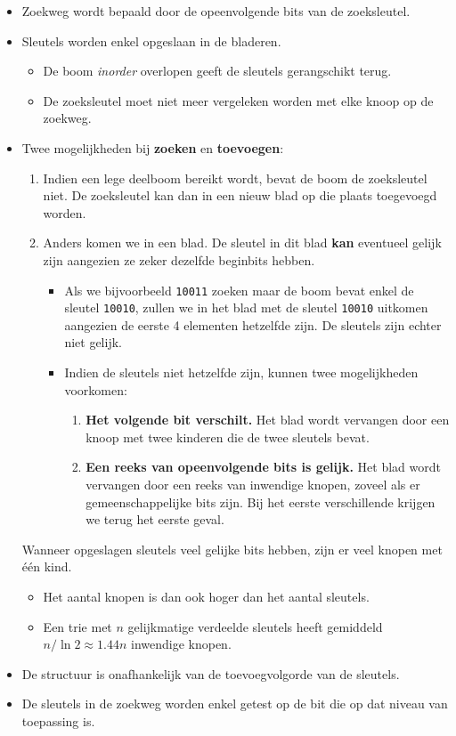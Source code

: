 \begin{itemize}
    \item Zoekweg wordt bepaald door de opeenvolgende bits van de zoeksleutel.
    \item Sleutels worden enkel opgeslaan in de bladeren.
    \begin{itemize}
        \item  De boom \textit{inorder} overlopen geeft de sleutels gerangschikt terug.
        \item  De zoeksleutel moet niet meer vergeleken worden met elke knoop op de zoekweg. 
    \end{itemize}
    \item Twee mogelijkheden bij \textbf{zoeken} en \textbf{toevoegen}:
    \begin{enumerate}
        \item Indien een lege deelboom bereikt wordt, bevat de boom de zoeksleutel niet. De zoeksleutel kan dan in een nieuw blad op die plaats toegevoegd worden.
        \item Anders komen we in een blad. De sleutel in dit blad \textbf{kan} eventueel gelijk zijn aangezien ze zeker dezelfde beginbits hebben.  

        \begin{itemize}
            \item Als we bijvoorbeeld \texttt{10011} zoeken maar de boom bevat enkel de sleutel \texttt{10010}, zullen we in het blad met de sleutel \texttt{10010} uitkomen aangezien de eerste 4 elementen hetzelfde zijn. De sleutels zijn echter niet gelijk.
            \item Indien de sleutels niet hetzelfde zijn, kunnen twee mogelijkheden voorkomen:
            \begin{enumerate}
                \item \textbf{Het volgende bit verschilt.} Het blad wordt vervangen door een knoop met twee kinderen die de twee sleutels bevat.
                \item \textbf{Een reeks van opeenvolgende bits is gelijk.} Het blad wordt vervangen door een reeks van inwendige knopen, zoveel als er gemeenschappelijke bits zijn. Bij het eerste verschillende krijgen we terug het eerste geval.
            \end{enumerate}
        \end{itemize}
    \end{enumerate}
    \alert Wanneer opgeslagen sleutels veel gelijke bits hebben, zijn er veel knopen met één kind.
    \begin{itemize}
        \item Het aantal knopen is dan ook hoger dan het aantal sleutels.
        \item Een trie met $n$ gelijkmatige verdeelde sleutels heeft gemiddeld $n/\ln 2 \approx 1.44n$ inwendige knopen.
    \end{itemize}
    \item De structuur is onafhankelijk van de toevoegvolgorde van de sleutels.
    \item De sleutels in de zoekweg worden enkel getest op de bit die op dat niveau van toepassing is.
\end{itemize}


